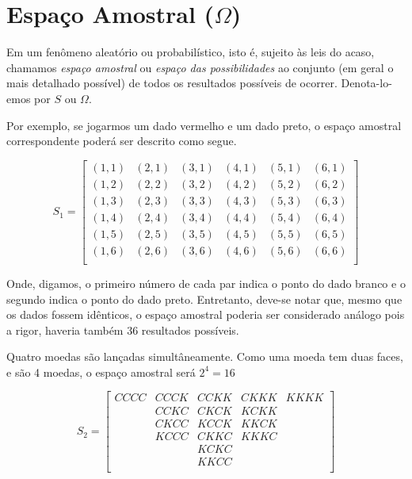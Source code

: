 \section{Espaço Amostral ($\Omega$)}

Em um fenômeno aleatório ou probabilístico, isto é, sujeito às
leis do acaso, chamamos \emph{espaço amostral} ou \emph{espaço das
possibilidades} ao conjunto (em geral o mais detalhado possível)
de todos os resultados possíveis de ocorrer. Denota-lo-emos por
$S$ ou $\Omega$.\vskip0.3cm

Por exemplo, se jogarmos um dado vermelho e um dado preto, o
espaço amostral correspondente poderá ser descrito como segue.

$$
S_{1} =
\left[%
\begin{array}{cccccc}
  (1,1) & (2,1) & (3,1) & (4,1) & (5,1) & (6,1) \\
  (1,2) & (2,2) & (3,2) & (4,2) & (5,2) & (6,2) \\
  (1,3) & (2,3) & (3,3) & (4,3) & (5,3) & (6,3) \\
  (1,4) & (2,4) & (3,4) & (4,4) & (5,4) & (6,4) \\
  (1,5) & (2,5) & (3,5) & (4,5) & (5,5) & (6,5) \\
  (1,6) & (2,6) & (3,6) & (4,6) & (5,6) & (6,6) \\
\end{array}%
\right]
$$

Onde, digamos, o primeiro número de cada par indica o ponto do
dado branco e o segundo indica o ponto do dado preto. Entretanto, deve-se notar que, mesmo que os dados fossem
idênticos, o espaço amostral poderia ser considerado análogo pois
a rigor, haveria também 36 resultados possíveis.\vskip0.3cm


Quatro moedas são lançadas simultâneamente. Como uma moeda tem duas faces, e são 4 moedas, o espaço amostral será $2^{4}=16$ 

$$
S_{2} =
\left[%
\begin{array}{ccccc}
  CCCC  & CCCK  & CCKK  & CKKK  & KKKK \\
        & CCKC  & CKCK  & KCKK  &      \\
        & CKCC  & KCCK  & KKCK  &      \\
        & KCCC  & CKKC  & KKKC  &      \\
        &       & KCKC  &       &      \\
        &       & KKCC  &       &      \\
\end{array}%
\right]
$$

